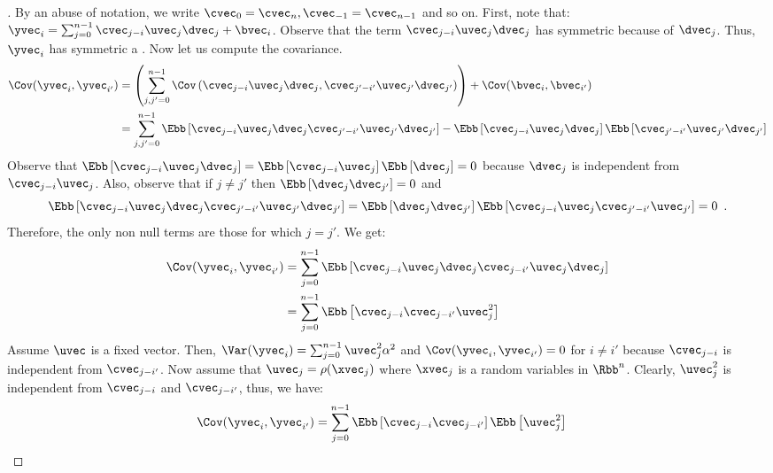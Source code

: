 \begin{proof}[]
  By an abuse of notation, we write $\cvec_0 = \cvec_n, \cvec_{-1} = \cvec_{n-1}$ and so on.
  First, note that: $\yvec_i = \sum_{j=0}^{n-1} \cvec_{j-i} \uvec_j \dvec_j + \bvec_i$.
  Observe that the term $\cvec_{j-i}\uvec_j\dvec_j$ has symmetric \pdf because of $\dvec_j$.
  Thus, $\yvec_i$ has symmetric a \pdf.
  Now let us compute the covariance.
  \begin{align}
    \Cov(\yvec_i,\yvec_{i'}) &= \left( \sum_{j,j'=0}^{n-1} \Cov\left(\cvec_{j-i}\uvec_j\dvec_j,\cvec_{j'-i'}\uvec_{j'}\dvec_{j'}\right) \right) + \Cov(\bvec_i, \bvec_{i'}) \\
      &= \sum_{j,j'=0}^{n-1} \Ebb\left[\cvec_{j-i}\uvec_j\dvec_j\cvec_{j'-i'}\uvec_{j'}\dvec_{j'}\right] - \Ebb\left[\cvec_{j-i}\uvec_j\dvec_j\right] \Ebb\left[ \cvec_{j'-i'}\uvec_{j'}\dvec_{j'} \right]
  \end{align}
  Observe that $\Ebb\left[\cvec_{j-i}\uvec_j\dvec_j\right] = \Ebb\left[\cvec_{j-i}\uvec_j\right] \Ebb\left[\dvec_j\right] = 0$ because $\dvec_j$ is independent from $\cvec_{j-i}\uvec_j$.
  Also, observe that if $j\neq j'$ then $\Ebb\left[\dvec_j\dvec_{j'}\right]=0$ and
  \begin{equation}
    \Ebb\left[\cvec_{j-i} \uvec_j \dvec_j \cvec_{j'-i'} \uvec_{j'} \dvec_{j'} \right] = \Ebb\left[ \dvec_j \dvec_{j'} \right] \Ebb\left[ \cvec_{j-i} \uvec_j \cvec_{j'-i'} \uvec_{j'} \right] = 0 \enspace.
  \end{equation}
  Therefore, the only non null terms are those for which $j = j'$.
  We get:
  \begin{align}
    \Cov(\yvec_i,\yvec_{i'}) & =\sum_{j=0}^{n-1} \Ebb\left[\cvec_{j-i}\uvec_j\dvec_j\cvec_{j-i'}\uvec_j\dvec_j\right] \\
     & =\sum_{j=0}^{n-1} \Ebb\left[\cvec_{j-i}\cvec_{j-i'}\uvec_j^{2}\right]
 \end{align}
  Assume $\uvec$ is a fixed vector.
  Then, $\Var(\yvec_i) = \sum_{j=0}^{n-1} \uvec_j^{2} \alpha^2$ and $\Cov(\yvec_i,\yvec_{i'}) = 0$ for $i\neq i'$ because $\cvec_{j-i}$ is independent from $\cvec_{j-i'}$.
  Now assume that $\uvec_j = \rho(\xvec_j)$ where $\xvec_j$ is a random variables in $\Rbb^n$.
  Clearly, $\uvec_j^2$ is independent from $\cvec_{j-i}$ and $\cvec_{j-i'}$, thus, we have:
  \begin{align}
    \Cov(\yvec_i,\yvec_{i'}) &= \sum_{j=0}^{n-1} \Ebb \left[ \cvec_{j-i}\cvec_{j-i'}\right] \Ebb\left[ \uvec_j^2 \right]
  \end{align}

\end{proof}
